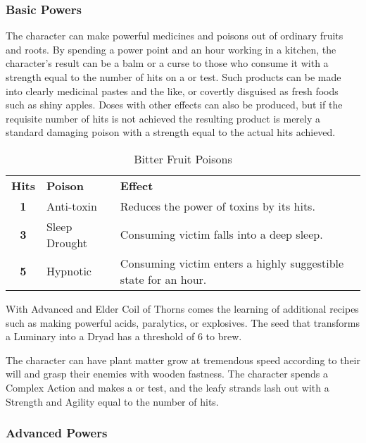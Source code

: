 \subsubsection{Basic Powers}

 The character can make powerful medicines and poisons out of ordinary fruits and roots. By spending a power point and an hour working in a kitchen, the character's result can be a balm or a curse to those who consume it with a strength equal to the number of hits on a  or  test. Such products can be made into clearly medicinal pastes and the like, or covertly disguised as fresh foods such as shiny apples. Doses with other effects can also be produced, but if the requisite number of hits is not achieved the resulting product is merely a standard damaging poison with a strength equal to the actual hits achieved.

\begin{table}[htb]
 \caption{Bitter Fruit Poisons} \centering
\begin{tabular}{c l l}
\textbf{Hits}&\textbf{Poison}&\textbf{Effect}\\
\textbf{1}&Anti-toxin& Reduces the power of toxins by its hits.\\
\textbf{3}&Sleep Drought& Consuming victim falls into a deep sleep.\\
\textbf{5}&Hypnotic&Consuming victim enters a highly suggestible state for an hour.\\
\end{tabular}
\end{table}
With Advanced and Elder Coil of Thorns comes the learning of additional recipes such as making powerful acids, paralytics, or explosives. The seed that transforms a Luminary into a Dryad has a threshold of 6 to brew.

 The character can have plant matter grow at tremendous speed according to their will and grasp their enemies with wooden fastness. The character spends a Complex Action and makes a  or  test, and the leafy strands lash out with a Strength and Agility equal to the number of hits.


\subsubsection{Advanced Powers}

